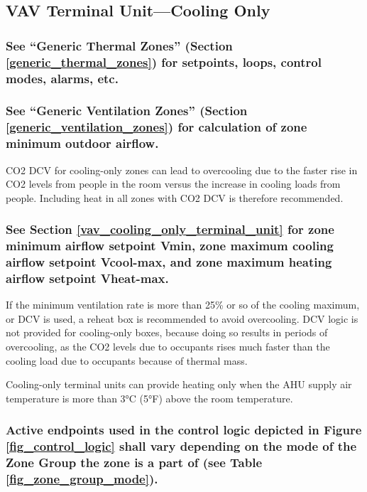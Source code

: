 \documentclass[10pt]{article}
\begin{document}
\addtocounter{subsection}{1}

\subsection{VAV Terminal Unit—Cooling Only}
\subsubsection{See “Generic Thermal Zones” (Section \ref{generic_thermal_zones}) for setpoints, loops, control modes, alarms, etc.}
\subsubsection{See “Generic Ventilation Zones” (Section \ref{generic_ventilation_zones}) for calculation of zone minimum outdoor airflow.}

CO2 DCV for cooling-only zones can lead to overcooling due to the faster rise in CO2 levels from people in the room versus the increase in cooling loads from people. Including heat in all zones with CO2 DCV is therefore recommended. 

\subsubsection{See Section \ref{vav_cooling_only_terminal_unit} for zone minimum airflow setpoint Vmin, zone maximum cooling airflow setpoint Vcool-max, and zone maximum heating airflow setpoint Vheat-max.}

If the minimum ventilation rate is more than 25\% or so of the cooling maximum, or DCV is used, a reheat box is recommended to avoid overcooling. DCV logic is not provided for cooling-only boxes, because doing so results in periods of overcooling, as the CO2 levels due to occupants rises much faster than the cooling load due to occupants because of thermal mass.

Cooling-only terminal units can provide heating only when the AHU supply air temperature is more than 3°C (5°F) above the room temperature.

\subsubsection{Active endpoints used in the control logic depicted in Figure \ref{fig_control_logic} shall vary depending on the mode of the Zone Group the zone is a part of (see Table \ref{fig_zone_group_mode}).}
\end{document}
